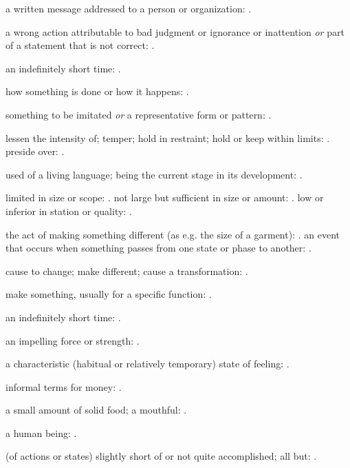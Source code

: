   a written message addressed to a person or organization: .

  a wrong action attributable to bad judgment or ignorance or inattention \textit{or} part of a statement that is not correct: .

  an indefinitely short time: .

  how something is done or how it happens: .

  something to be imitated \textit{or} a representative form or pattern: .

  lessen the intensity of; temper; hold in restraint; hold or keep within limits: . preside over: .

  used of a living language; being the current stage in its development: .

  limited in size or scope: . not large but sufficient in size or amount: . low or inferior in station or quality: .

  the act of making something different (as e.g. the size of a garment): . an event that occurs when something passes from one state or phase to another: .

  cause to change; make different; cause a transformation: .

  make something, usually for a specific function: .

  an indefinitely short time: .

  an impelling force or strength: .

  a characteristic (habitual or relatively temporary) state of feeling: .

  informal terms for money: .

  a small amount of solid food; a mouthful: \vocab{}.

  a human being: .

  (of actions or states) slightly short of or not quite accomplished; all but: .


